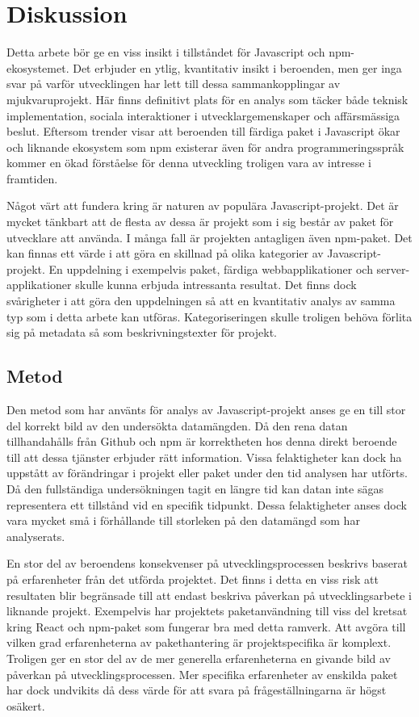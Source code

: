 \section{Diskussion}
\label{sec:joel_o-discussion}
Detta arbete bör ge en viss insikt i tillståndet för Javascript och npm-ekosystemet. Det erbjuder en ytlig, kvantitativ insikt i beroenden, men ger inga svar på varför utvecklingen har lett till dessa sammankopplingar av mjukvaruprojekt. Här finns definitivt plats för en analys som täcker både teknisk implementation, sociala interaktioner i utvecklargemenskaper och affärsmässiga beslut. Eftersom trender visar att beroenden till färdiga paket i Javascript ökar\cite{Wittern:2016} och liknande ekosystem som npm existerar även för andra programmeringsspråk kommer en ökad förståelse för denna utveckling troligen vara av intresse i framtiden.

Något värt att fundera kring är naturen av populära Javascript-projekt. Det är mycket tänkbart att de flesta av dessa är projekt som i sig består av paket för utvecklare att använda. I många fall är projekten antagligen även npm-paket. Det kan finnas ett värde i att göra en skillnad på olika kategorier av Javascript-projekt. En uppdelning i exempelvis paket, färdiga webbapplikationer och server-applikationer skulle kunna erbjuda intressanta resultat. Det finns dock svårigheter i att göra den uppdelningen så att en kvantitativ analys av samma typ som i detta arbete kan utföras. Kategoriseringen skulle troligen behöva förlita sig på metadata så som beskrivningstexter för projekt.

\subsection{Metod}
\label{subsec:joel_o-discussion-method}
Den metod som har använts för analys av Javascript-projekt anses ge en till stor del korrekt bild av den undersökta datamängden. Då den rena datan tillhandahålls från Github och npm är korrektheten hos denna direkt beroende till att dessa tjänster erbjuder rätt information. Vissa felaktigheter kan dock ha uppstått av förändringar i projekt eller paket under den tid analysen har utförts. Då den fullständiga undersökningen tagit en längre tid kan datan inte sägas representera ett tillstånd vid en specifik tidpunkt. Dessa felaktigheter anses dock vara mycket små i förhållande till storleken på den datamängd som har analyserats.

En stor del av beroendens konsekvenser på utvecklingsprocessen beskrivs baserat på erfarenheter från det utförda projektet. Det finns i detta en viss risk att resultaten blir begränsade till att endast beskriva påverkan på utvecklingsarbete i liknande projekt. Exempelvis har projektets paketanvändning till viss del kretsat kring React och npm-paket som fungerar bra med detta ramverk. Att avgöra till vilken grad erfarenheterna av pakethantering är projektspecifika är komplext. Troligen ger en stor del av de mer generella erfarenheterna en givande bild av påverkan på utvecklingsprocessen. Mer specifika erfarenheter av enskilda paket har dock undvikits då dess värde för att svara på frågeställningarna är högst osäkert.

